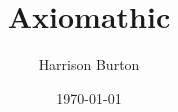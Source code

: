\documentclass[a5paper, 8pt]{book}
\begin{document}
\title{Axiomathic}
\author{Harrison Burton}
\date{\today}
\maketitle

\tableofcontents









\end{document}
